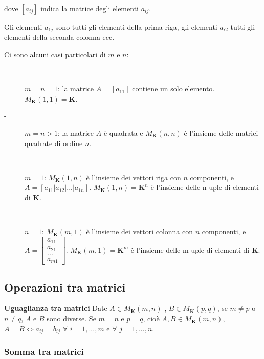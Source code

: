 \documentclass{article}
\begin{document}
dove $\left[ a_{ij}\right] $ indica la matrice degli elementi $a_{ij}$.

Gli elementi $a_{1j}$ sono tutti gli elementi della prima riga, gli elementi 
$a_{i2}$ tutti gli elementi della seconda colonna ecc.

Ci sono alcuni casi particolari di $m$ e $n$:

\begin{description}
\item[-] $m=n=1$: la matrice $A=\left[ a_{11}\right] $ contiene un solo
elemento. $M_{\mathbf{K}}\left( 1,1\right) =\mathbf{K}$.

\item[-] $m=n>1$: la matrice $A$ \`{e} quadrata e $M_{\mathbf{K}}\left(
n,n\right) $ \`{e} l'insieme delle matrici quadrate di ordine $n$.

\item[-] $m=1$: $M_{\mathbf{K}}\left( 1,n\right) $ \`{e} l'insieme dei
vettori riga con $n$ componenti, e $A=\left[ a_{11}|a_{12}|...|a_{1n}\right] 
$. $M_{\mathbf{K}}\left( 1,n\right) =\mathbf{K}^{n}$ \`{e} l'insieme delle
n-uple di elementi di $\mathbf{K}$.

\item[-] $n=1$: $M_{\mathbf{K}}\left( m,1\right) $ \`{e} l'insieme dei
vettori colonna con $n$ componenti, e $A=\left[ 
\begin{array}{c}
a_{11} \\ 
a_{21} \\ 
... \\ 
a_{m1}%
\end{array}%
\right] $. $M_{\mathbf{K}}\left( m,1\right) =\mathbf{K}^{m}$ \`{e} l'insieme
delle m-uple di elementi di $\mathbf{K}$.
\end{description}

\subsection{Operazioni tra matrici}

\textbf{Uguaglianza tra matrici} Date $A\in M_{\mathbf{K}}\left( m,n\right) $%
, $B\in M_{\mathbf{K}}\left( p,q\right) $, se $m\neq p$ o $n\neq q$, $A$ e $%
B $ sono diverse. Se $m=n$ e $p=q$, cio\`{e} $A,B\in M_{\mathbf{K}}\left(
m,n\right) $, $A=B\Longleftrightarrow a_{ij}=b_{ij}$ $\forall $ $i=1,...,m$
e $\forall $ $j=1,...,n$.

\subsubsection{Somma tra matrici}
\end{document}

